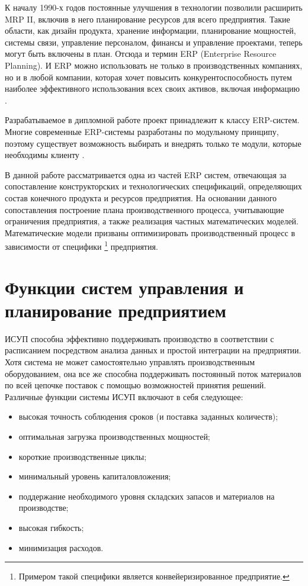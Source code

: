 К началу 1990-х годов постоянные улучшения в технологии позволили расширить MRP II, включив в него планирование ресурсов для всего предприятия. Такие области, как дизайн продукта, хранение информации, планирование мощностей, системы связи, управление персоналом, финансы и управление проектами, теперь могут быть включены в план. Отсюда и термин ERP (Enterprise Resource Planning). И ERP можно использовать не только в производственных компаниях, но и в любой компании, которая хочет повысить конкурентоспособность путем наиболее эффективного использования всех своих активов, включая информацию \cite{ptak_schragenheim_2004}.

Разрабатываемое в дипломной работе проект принадлежит к классу ERP-систем. Многие современные ERP-системы разработаны по модульному принципу, поэтому существует возможность выбирать и внедрять только те модули, которые необходимы клиенту \cite{oliriBook}.

В данной работе рассматривается одна из частей ERP систем, отвечающая за сопоставление конструкторских и технологических спецификаций, определяющих состав конечного продукта и ресурсов предприятия. На основании данного сопоставления построение плана производственного процесса, учитывающие ограничения предприятия, а также реализация частных математических моделей. Математические модели призваны оптимизировать производственный процесс в зависимости от специфики \footnote{Примером такой специфики является конвейеризированное предприятие.} предприятия.

\section{Функции систем управления и планирование предприятием}

ИСУП способна эффективно поддерживать производство в соответствии с расписанием посредством анализа данных и простой интеграции на предприятии. Хотя система не может самостоятельно управлять производственным оборудованием, она все же способна поддерживать постоянный поток материалов по всей цепочке поставок с помощью возможностей принятия решений. Различные функции системы ИСУП включают в себя следующее:

\begin{itemize}
    \item высокая точность соблюдения сроков (и поставка заданных количеств);
    \item оптимальная загрузка производственных мощностей;
    \item короткие производственные циклы;
    \item минимальный уровень капиталовложения;
    \item поддержание необходимого уровня складских запасов и материалов на производстве;
    \item высокая гибкость;
    \item минимизация расходов.
\end{itemize}

